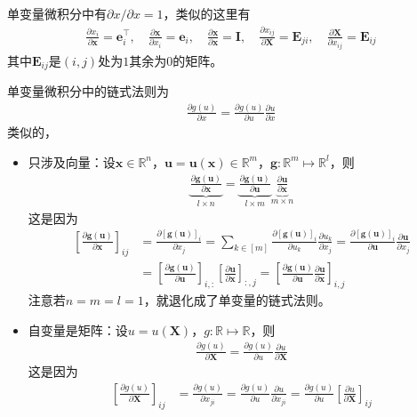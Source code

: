 \documentclass{ctexart}
\newcommand{\blue}[1]{\textcolor{Solarized-blue}{#1}}
\theoremstyle{definition}
\def \ev {\bm{e}}
\def \gv {\bm{g}}
\def \uv {\bm{u}}
\def \xv {\bm{x}}
\def \Ev {\mathbf{E}}
\def \Iv {\mathbf{I}}
\def \Xv {\mathbf{X}}
\def \Rbb {\mathbb{R}}
\begin{document}
单变量微积分中有$\partial x / \partial x = 1$，类似的这里有
\begin{align*}
    \frac{\partial x_i}{\partial \xv} = \ev_i^\top, \quad \frac{\partial \xv}{\partial x_i} = \ev_i, \quad \frac{\partial \xv}{\partial \xv} = \Iv, \quad \frac{\partial x_{ij}}{\partial \Xv} = \Ev_{ji}, \quad \frac{\partial \Xv}{\partial x_{ij}} = \Ev_{ij}
\end{align*}
其中$\Ev_{ij}$是$(i,j)$处为$1$其余为$0$的矩阵。

单变量微积分中的\blue{链式法则}为
\begin{align*}
    \frac{\partial g(u)}{\partial x} = \frac{\partial g(u)}{\partial u} \frac{\partial u}{\partial x}
\end{align*}
类似的，
\begin{itemize}
    \item 只涉及向量：设$\xv \in \Rbb^n$，$\uv = \uv(\xv) \in \Rbb^m$，$\gv: \Rbb^m \mapsto \Rbb^l$，则
          \begin{align*}
              \underbrace{\frac{\partial \gv(\uv)}{\partial \xv}}_{l \times n} = \underbrace{\frac{\partial \gv(\uv)}{\partial \uv}}_{l \times m} \underbrace{\frac{\partial \uv}{\partial \xv}}_{m \times n}
          \end{align*}
          这是因为
          \begin{align*}
              \left[ \frac{\partial \gv(\uv)}{\partial \xv} \right]_{ij} & = \frac{\partial [\gv(\uv)]_i}{\partial x_j} = \sum_{k \in [m]} \frac{\partial [\gv(\uv)]_i}{\partial u_k} \frac{\partial u_k}{\partial x_j} = \frac{\partial [\gv(\uv)]_i}{\partial \uv} \frac{\partial \uv}{\partial x_j} \\
                                                                         & = \left[ \frac{\partial \gv(\uv)}{\partial \uv} \right]_{i,:} \left[ \frac{\partial \uv}{\partial \xv} \right]_{:,j} = \left[ \frac{\partial \gv(\uv)}{\partial \uv} \frac{\partial \uv}{\partial \xv} \right]_{i,j}
          \end{align*}
          注意若$n = m = l = 1$，就退化成了单变量的链式法则。
    \item 自变量是矩阵：设$u = u(\Xv)$，$g: \Rbb \mapsto \Rbb$，则
          \begin{align*}
              \frac{\partial g(u)}{\partial \Xv} = \frac{\partial g(u)}{\partial u} \frac{\partial u}{\partial \Xv}
          \end{align*}
          这是因为
          \begin{align*}
              \left[ \frac{\partial g(u)}{\partial \Xv} \right]_{ij} & = \frac{\partial g(u)}{\partial x_{ji}} = \frac{\partial g(u)}{\partial u} \frac{\partial u}{\partial x_{ji}} = \frac{\partial g(u)}{\partial u} \left[ \frac{\partial u}{\partial \Xv} \right]_{ij}

\end{align*}
\end{itemize}
\end{document}
